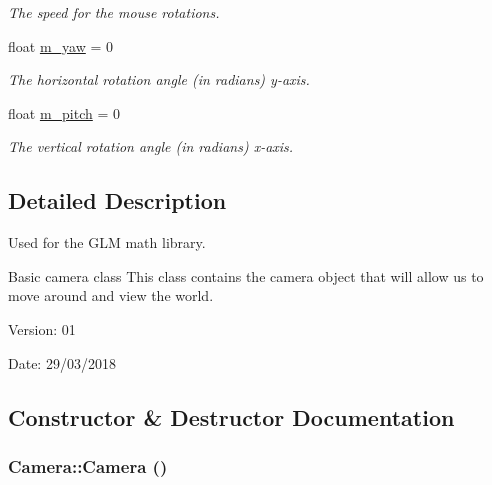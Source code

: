 \begin{CompactItemize}
\begin{CompactList}\small\item\em The speed for the mouse rotations. \item\end{CompactList}\item 
\hypertarget{class_camera_0f8807da02d4a1bb695be51793279873}{
float \hyperlink{class_camera_0f8807da02d4a1bb695be51793279873}{m\_\-yaw} = 0}
\label{class_camera_0f8807da02d4a1bb695be51793279873}

\begin{CompactList}\small\item\em The horizontal rotation angle (in radians) y-axis. \item\end{CompactList}\item 
\hypertarget{class_camera_2202e419e9440bbb26e6997248268b0b}{
float \hyperlink{class_camera_2202e419e9440bbb26e6997248268b0b}{m\_\-pitch} = 0}
\label{class_camera_2202e419e9440bbb26e6997248268b0b}

\begin{CompactList}\small\item\em The vertical rotation angle (in radians) x-axis. \item\end{CompactList}\end{CompactItemize}


\subsection{Detailed Description}
Used for the GLM math library. 

Basic camera class This class contains the camera object that will allow us to move around and view the world.

\begin{Desc}
\item[Version:]01 \end{Desc}
\begin{Desc}
\item[Date:]29/03/2018 \end{Desc}


\subsection{Constructor \& Destructor Documentation}
\hypertarget{class_camera_01f94c3543f56ede7af49dc778f19331}{
\subsubsection[Camera]{\setlength{\rightskip}{0pt plus 5cm}Camera::Camera ()}}
\label{class_camera_01f94c3543f56ede7af49dc778f19331}


